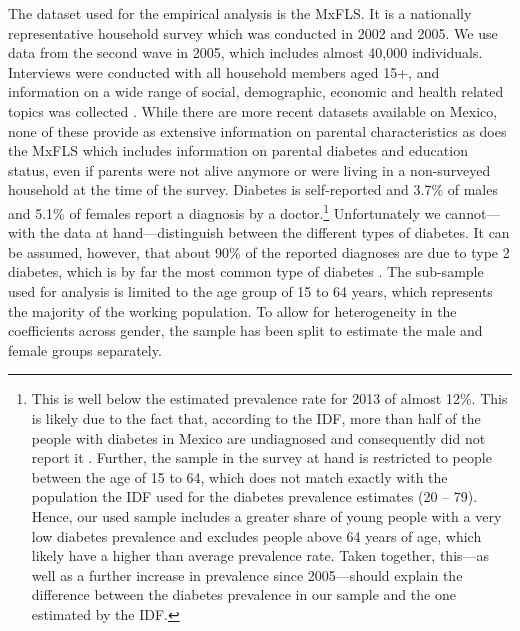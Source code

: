 The dataset used for the empirical analysis is the \acf{MxFLS}.
It is a nationally representative household survey which was conducted
in 2002 and 2005. We use data from the second wave in 2005, which
includes almost 40,000 individuals. Interviews were conducted with
all household members aged 15+, and information on a wide range of
social, demographic, economic and health related topics was collected
\parencite{Rubalcava2008}. While there are more recent datasets available
on Mexico, none of these provide as extensive information on parental
characteristics as does the \ac{MxFLS} which includes information
on parental diabetes and education status, even if parents were not
alive anymore or were living in a non-surveyed household at the time
of the survey. Diabetes is self-reported and 3.7\% of males
and 5.1\% of females report a diagnosis by a doctor.\footnote{
This is well below the estimated prevalence rate for 2013
of almost 12\%. This is likely due to the fact that, according
to the \ac{IDF}, more than half of the people with diabetes in Mexico
are undiagnosed and consequently did not report it \parencite{InternationalDiabetesFederation2013}.
Further, the sample in the survey at hand is restricted to people
between the age of 15 to 64, which does not match exactly with the
population the \ac{IDF} used for the diabetes prevalence estimates
(20 -- 79). Hence, our used sample includes a greater share of young
people with a very low diabetes prevalence and excludes people above
64 years of age, which likely have a higher than average prevalence
rate. Taken together, this---as well as a further increase in prevalence
since 2005---should explain the difference between the diabetes
prevalence in our sample and the one estimated by the \ac{IDF}.
} Unfortunately we cannot---with the data at hand---distinguish
between the different types of diabetes. It can be assumed, however,
that about 90\% of the reported diagnoses are due to type 2
diabetes, which is by far the most common type of diabetes \parencite{Sicree2009}.
The sub-sample used for analysis is limited to the age group of 15
to 64 years, which represents the majority of the working population.
To allow for heterogeneity in the coefficients across gender, the
sample has been split to estimate the male and female groups separately. 



